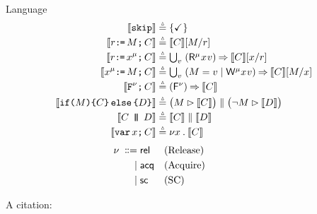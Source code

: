 Language
\begin{gather*}
  \begin{aligned}
    \sem[\aThrd]{\SKIP} & \eqdef
    \{ \DSTOP \}
    \\
    \sem[\aThrd]{\aReg\GETS\aExp\SEMI \aCmd} & \eqdef
    \sem[\aThrd]{\aCmd}[\aExp/\aReg]
    \\ 
    \sem{\aReg\GETS\aLoc^{\amode}\SEMI \aCmd} & \eqdef \textstyle\bigcup_\aVal\;
    (\DR[\amode]\aLoc\aVal)\prefix \sem{\aCmd} [\aLoc/\aReg]
    \\
    \sem{\aLoc^{\amode}\GETS\aExp\SEMI \aCmd} & \eqdef
    \textstyle\bigcup_\aVal\; (\aExp=\aVal \mid \DW[\amode]\aLoc\aVal)\prefix \sem{\aCmd}[\aExp/\aLoc]
    \\
    \sem{\FENCE^{\fmode}\SEMI \aCmd} & \eqdef
    (\DFS{\fmode}) \prefix \sem{\aCmd}
    \\
    \sem[\aThrd]{\IF{\aExp} \THEN \aCmd \ELSE \bCmd \FI} & \eqdef
    \bigl(\aExp \guard \sem[\aThrd]{\aCmd}\bigr) \parallel \bigl(\lnot\aExp \guard \sem[\aThrd]{\bCmd}\bigr) 
    \\
    \sem[\aThrd]{\aCmd \PAR[\bThrd][\bThrd'] \bCmd} & \eqdef
    \sem[\bThrd]{\aCmd} \parallel \sem[\bThrd']{\bCmd} 
    \\
    \sem[\aThrd]{\VAR\aLoc\SEMI \aCmd} & \eqdef
    \nu \aLoc \DOT \sem[\aThrd]{\aCmd}  
  \end{aligned}
\end{gather*}
\begin{align*}
  \nu \;\mathrel{\mathord{\vcentcolon}\mkern-1mu\mathord{\vcentcolon}\mathord{{=}}}\;&{\mathsf{rel}}  &&\text{(Release)} &\hbox{$\;\mkern60mu\;$}&
  \\ \;\mathrel{|}\;&{\mathsf{acq}}   &&\text{(Acquire)} 
  \\      \;\mathrel{|}\;&{\mathsf{sc}}  &&\text{(SC)} 
\end{align*}


A citation: \cite{10.1145/3428262}



